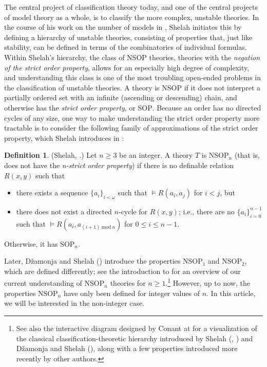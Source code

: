 \documentclass{amsart}
\theoremstyle{definition}
\newtheorem{definition}[theorem]{Definition}
\theoremstyle{remark}
\numberwithin{equation}{section}
\begin{document}
The central project of classification theory today, and one of the central projects of model theory as a whole, is to classify the more complex, unstable theories. In the course of his work on the number of models in \cite{Sh90}, Shelah initiates this by defining a hierarchy of unstable theories, consisting of properties that, just like stability, can be defined in terms of the combinatorics of individual formulas. Within Shelah's hierarchy, the class of $\mathrm{NSOP}$ theories, theories with the \textit{negation of the strict order property}, allows for an especially high degree of complexity, and understanding this class is one of the most troubling open-ended problems in the classification of unstable theories. A theory is $\mathrm{NSOP}$ if it does not interpret a partially ordered set with an infinite (ascending or descending) chain, and otherwise has the \textit{strict order property}, or $\mathrm{SOP}$. Because an order has no directed cycles of any size, one way to make understanding the strict order property more tractable is to consider the following family of approximations of the strict order property, which Shelah introduces in \cite{She95}:

\begin{definition}\label{original hierarchy} (Shelah, \cite{She95}.)
Let $n \geq 3$ be an integer. A theory $T$ is $\mathrm{NSOP}_{n}$ (that is, does not have the \emph{n-strict order property}) if there is no definable relation $R(x, y)$ such that

\begin{itemize}
    \item there exists a sequence $\{a_{i}\}_{i < \omega}$ such that $\models R(a_{i}, a_{j})$ for $i <j$, but

    \item there does not exist a directed $n$-cycle for $R(x, y)$; i.e., there are no $\{a_{i}\}^{n-1}_{i = 0}$ such that $\models R(a_{i}, a_{(i+1)\: \mathrm{mod}\: n}) $ for $0 \leq i \leq n-1$.
\end{itemize}
 Otherwise, it has $\mathrm{SOP}_{n}$.
\end{definition}

Later, Džamonja and Shelah (\cite{DS04}) introduce the properties $\mathrm{NSOP}_{1}$ and $\mathrm{NSOP}_{2}$, which are defined differently; see the introduction to \cite{SOPEXP} for an overview of our current understanding of $\mathrm{NSOP}_{n}$ theories for $n \geq 1$.\footnote{See also the interactive diagram designed by Conant at \cite{FD} for a visualization of the classical classification-theoretic hierarchy introduced by Shelah (\cite{Sh90}, \cite{She95}) and Džamonja and Shelah (\cite{DS04}), along with a few properties introduced more recently by other authors.} However, up to now, the properties $\mathrm{NSOP}_{n}$ have only been defined for integer values of $n$. In this article, we will be interested in the non-integer case.
\end{document}

